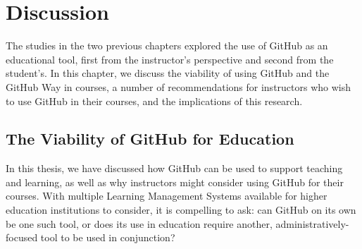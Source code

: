 \chapter{Discussion}
The studies in the two previous chapters explored the use of GitHub as an educational tool, first from the instructor's perspective and second from the student's. In this chapter, we discuss the viability of using GitHub and the GitHub Way in courses, a number of recommendations for instructors who wish to use GitHub in their courses, and the implications of this research.

\section{The Viability of GitHub for Education}
In this thesis, we have discussed how GitHub can be used to support teaching and learning, as well as why instructors might consider using GitHub for their courses. With multiple Learning Management Systems available for higher education institutions to consider, it is compelling to ask: can GitHub on its own be one such tool, or does its use in education require another, administratively-focused tool to be used in conjunction?


